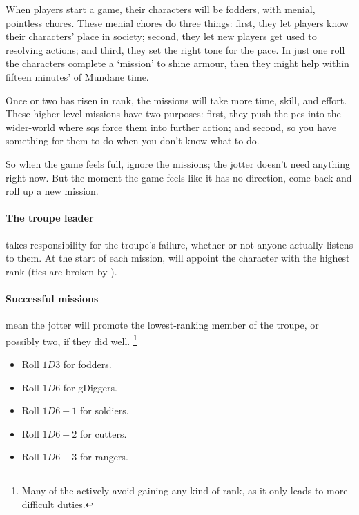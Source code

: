 \begin{multicols}{2}

\noindent
When players start a game, their characters will be \glspl{fodder}, with menial, pointless chores.
These menial chores do three things: first, they let players know their characters' place in society; second, they let new players get used to resolving actions; and third, they set the right tone for the pace.
In just one roll the characters complete a `mission' to shine armour, then they might help  within fifteen minutes' of Mundane time.

Once  or two has risen in rank, the missions will take more time, skill, and effort.
These higher-level missions have two purposes: first, they push the \glspl{pc} into the wider-world where \glspl{sq} force them into further action; and second, so you have something for them to do when you don't know what to do.

So when the game feels full, ignore the missions; the \gls{jotter} doesn't need anything right now.
But the moment the game feels like it has no direction, come back and roll up a new mission.

\paragraph{The troupe leader}
takes responsibility for the troupe's failure, whether or not anyone actually listens to them.
At the start of each mission,  will appoint the character with the highest rank (ties are broken by ).

\paragraph{Successful missions}
mean the \gls{jotter} will promote the lowest-ranking member of the troupe, or possibly two, if they did well.%
\footnote{Many of the  actively avoid gaining any kind of rank, as it only leads to more difficult duties.}

\null
\begin{itemize}
  \item
  Roll $1D3$ for \glspl{fodder}.
  \item
  Roll $1D6$ for \glspl{gDigger}.
  \item
  Roll $1D6+1$ for \glspl{soldier}.
  \item
  Roll $1D6+2$ for \glspl{cutter}.
  \item
  Roll $1D6+3$ for \glspl{ranger}.
\end{itemize}


\end{multicols}
